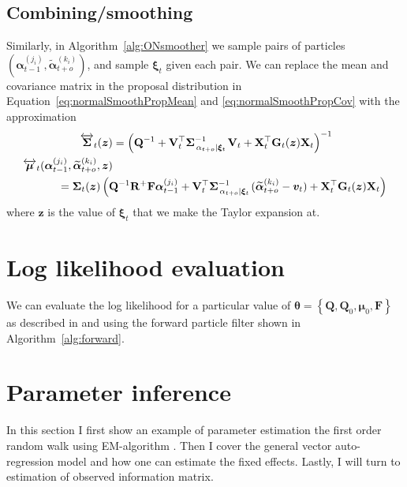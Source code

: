 \documentclass[notitlepage]{article}
\renewcommand{\vec}[1]{\bm{#1}}
\newcommand{\vecLRarrow}[1]{\overleftrightarrow{\vec{#1}}}
\newcommand{\mat}[1]{\mathbf{#1}}
\newcommand{\matLRarrow}[1]{\overleftrightarrow{\mat{#1}}}
\newcommand{\Lbrace}[1]{\left\{ #1\right\}}
\newcommand{\Lparen}[1]{\left( #1\right)}
\newcommand\subCond[3]{#1_{\left. #2 \middle\vert #3\right.}}
\newcommand{\partic}[3]{#1_{#2}^{\Lparen{#3}}}
\newcommand{\particB}[3]{\widetilde{#1}_{#2}^{\Lparen{#3}}}
\begin{document}
\subsection{Combining/smoothing}
Similarly, in Algorithm~\ref{alg:ONsmoother} we sample pairs of particles 
$(\partic{\vec{\alpha}}{t - 1}{j_i}, \particB{\vec{\alpha}}{t + o}{k_i})$, 
and sample $\vec\xi_t$ given each pair. We can replace the mean and covariance matrix in 
the proposal distribution in Equation~\eqref{eq:normalSmoothPropMean} and 
\eqref{eq:normalSmoothPropCov} with the approximation %
%
\begin{align*}
\matLRarrow\Sigma_t(\vec z) &= \Lparen{
	\mat Q^{-1} + 
	\mat V_t^\top\subCond{\mat\Sigma}{\alpha_{t + o}}{\vec\xi_t}^{-1}\mat V_t + 
	\mat X_t^\top \mat G_t(\vec z) \mat X_t}^{-1}\\
\vecLRarrow\mu_t(\partic{\vec{\alpha}}{t - 1}{j_i}, 
	\particB{\vec{\alpha}}{t + o}{k_i}, \vec z) & \\
	&\hspace{-50pt}=
	\mat\Sigma_t(\vec z)\Lparen{
		\mat Q^{-1}\mat R^+\mat F\partic{\vec{\alpha}}{t - 1}{j_i} + 
		\mat V_t^\top\subCond{\mat\Sigma}{\alpha_{t + o}}{\vec\xi_t}^{-1}
			(\particB{\vec{\alpha}}{t + o}{k_i} - \vec v_t) + 
		\mat X_t^\top \mat G_t(\vec z) \mat X_t}
\end{align*}%
% 
where $\vec z$ is the value of $\vec\xi_t$ that we make the Taylor expansion at. 





\section{Log likelihood evaluation}
We can evaluate the log likelihood for a particular value of $\vec{\theta} = \Lbrace{\mat{Q}, \mat{Q}_0, \vec \mu_0, \mat{F}}$ as described in \citet[page 5]{doucet09} and \citet[page 193]{malik11} using the forward particle filter shown in Algorithm~\ref{alg:forward}.

\section{Parameter inference}
In this section I first show an example of parameter estimation the first 
order random walk using EM-algorithm \citep{dempster77}. Then I cover the 
general vector auto-regression model and how one can estimate the fixed 
effects. Lastly, I will turn to estimation of observed information matrix. 
\end{document}
